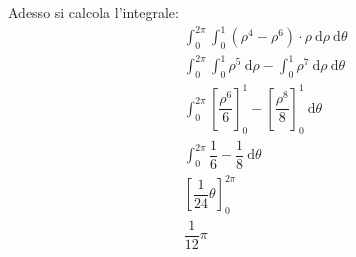 \documentclass[a4paper]{article}
\begin{document}
	\noindent
	Adesso si calcola l'integrale:
	\begin{equation*}
		\begin{array}{ll}
			& \displaystyle\int_{0}^{2\pi}\int_{0}^{1} \left(\rho^{4} - \rho^{6}\right) \cdot \rho \:\mathrm{d}\rho\:\mathrm{d}\theta \\ [2em]
			& \displaystyle\int_{0}^{2\pi}\int_{0}^{1} \rho^{5} \:\mathrm{d}\rho - \int_{0}^{1} \rho^{7} \:\mathrm{d}\rho\:\mathrm{d}\theta \\ [2em]
			& \displaystyle\int_{0}^{2\pi} \left[\dfrac{\rho^{6}}{6}\right]_{0}^{1} - \left[\dfrac{\rho^{8}}{8}\right]_{0}^{1} \:\mathrm{d}\theta \\ [2em]
			& \displaystyle\int_{0}^{2\pi} \dfrac{1}{6} - \dfrac{1}{8} \:\mathrm{d}\theta \\ [2em]
			& \left[\dfrac{1}{24}\theta\right]_{0}^{2\pi} \\ [1.7em]
			& \dfrac{1}{12}\pi
		\end{array}
	\end{equation*}\newpage
\end{document}
